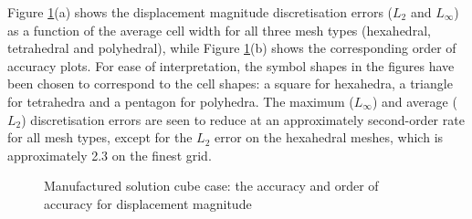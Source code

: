 \documentclass[sn-mathphys,Numbered]{sn-jnl}%
\begin{document}
Figure \ref{fig:mms_disp_accuracy}(a) shows the displacement magnitude discretisation errors ($L_2$ and $L_\infty$) as a function of the average cell width for all three mesh types (hexahedral, tetrahedral and polyhedral), while Figure \ref{fig:mms_disp_accuracy}(b) shows the corresponding order of accuracy plots.
For ease of interpretation, the symbol shapes in the figures have been chosen to correspond to the cell shapes: a square for hexahedra, a triangle for tetrahedra and a pentagon for polyhedra.
The maximum ($L_\infty$) and average ($L_2$) discretisation errors are seen to reduce at an approximately second-order rate for all mesh types, except for the $L_2$ error on the hexahedral meshes, which is approximately 2.3 on the finest grid.
\begin{figure}[htbp]
	\centering
	\caption{Manufactured solution cube case: the accuracy and order of accuracy for displacement magnitude}
	\label{fig:mms_disp_accuracy}
\end{figure}
\end{document}
